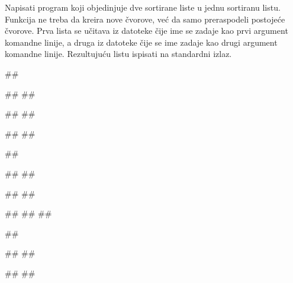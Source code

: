 \begin{Exercise}[label=609]
Napisati program koji objedinjuje dve sortirane liste u jednu sortiranu listu. Funkcija ne treba da 
kreira nove čvorove, već da samo preraspodeli postojeće čvorove. Prva lista se učitava iz datoteke čije ime se zadaje kao prvi argument komandne linije, a druga iz datoteke čije se ime zadaje kao drugi argument komandne linije. Rezultujuću listu ispisati na standardni izlaz.

\noindent
\begin{miditest}
\begin{test}{1}
##

##
##

##
##

#\naslovIzlaz#
##
\end{test}
\end{miditest}
\begin{miditest}
\begin{test}{2}
##

##
##

##
##

#\naslovIzlaz#
##
##
\end{test}
\end{miditest}
\begin{miditest}
\begin{test}{3}
##

##
##

##
##


\end{test}
\end{miditest}
\end{Exercise}
